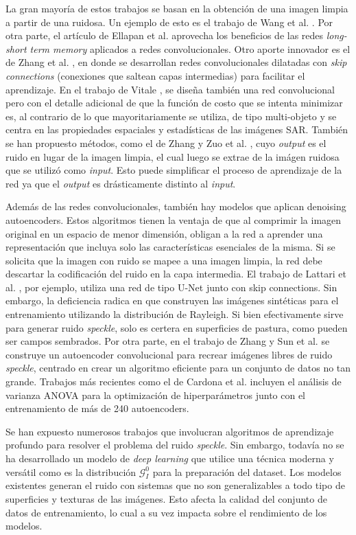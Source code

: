 La gran mayoría de estos trabajos se basan en la obtención de una imagen limpia a partir de una ruidosa. Un ejemplo de esto es el trabajo de Wang et al. \cite{wang2017sar}. Por otra parte, el artículo de Ellapan et al. \cite{ellappan2021deep} aprovecha los beneficios de las redes \emph{long-short term memory} aplicados a redes convolucionales. Otro aporte innovador es el de Zhang et al. \cite{zhang2018dilated}, en donde se desarrollan redes convolucionales dilatadas con \emph{skip connections} (conexiones que saltean capas intermedias) para facilitar el aprendizaje. En el trabajo de Vitale \cite{vitale2021multiobjective}, se diseña también una red convolucional pero con el detalle adicional de que la función de costo que se intenta minimizar es, al contrario de lo que mayoritariamente se utiliza, de tipo multi-objeto y se centra en las propiedades espaciales y estadísticas de las imágenes SAR. También se han propuesto métodos, como el de Zhang y Zuo et al. \cite{zhang2016beyond}, cuyo \emph{output} es el ruido en lugar de la imagen limpia, el cual luego se extrae de la imágen ruidosa que se utilizó como \emph{input}. Esto puede simplificar el proceso de aprendizaje de la red ya que el \emph{output} es drásticamente distinto al \emph{input}.

Además de las redes convolucionales, también hay modelos que aplican denoising autoencoders. Estos algoritmos tienen la ventaja de que al comprimir la imagen original en un espacio de menor dimensión, obligan a la red a aprender una representación que incluya solo las características esenciales de la misma. Si se solicita que la imagen con ruido se mapee a una imagen limpia, la red debe descartar la codificación del ruido en la capa intermedia. El trabajo de Lattari et al. \cite{lattari2019deep}, por ejemplo, utiliza una red de tipo U-Net junto con skip connections. Sin embargo, la deficiencia radica en que construyen las imágenes sintéticas para el entrenamiento utilizando la distribución de Rayleigh. Si bien efectivamente sirve para generar ruido \emph{speckle}, solo es certera en superficies de pastura, como pueden ser campos sembrados. Por otra parte, en el trabajo de Zhang y Sun et al. \cite{zhang2020autoencoder} se construye un autoencoder convolucional para recrear imágenes libres de ruido \emph{speckle}, centrado en crear un algoritmo eficiente para un conjunto de datos no tan grande. Trabajos más recientes como el de Cardona et al. \cite{cardona2025optimization} incluyen el análisis de varianza ANOVA para la optimización de hiperparámetros junto con el entrenamiento de más de 240 autoencoders.

Se han expuesto numerosos trabajos que involucran algoritmos de aprendizaje profundo para resolver el problema del ruido \emph{speckle}. Sin embargo, todavía no se ha desarrollado un modelo de \emph{deep learning} que utilice una técnica moderna y versátil como es la distribución \( \mathcal{G}_I^0 \) para la preparación del dataset. Los modelos existentes generan el ruido con sistemas que no son generalizables a todo tipo de superficies y texturas de las imágenes. Esto afecta la calidad del conjunto de datos de entrenamiento, lo cual a su vez impacta sobre el rendimiento de los modelos.
